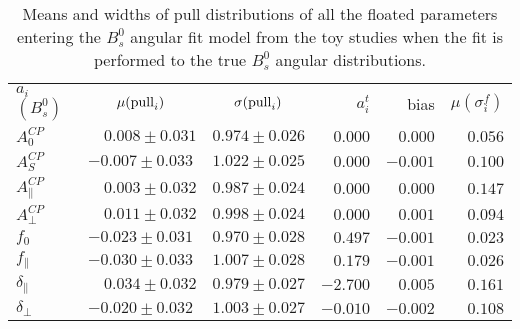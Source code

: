 \begin{table}[htbp]
\begin{center}
\caption[Means and widths of pull distributions of all the floated parameters entering the angular fit model from the toy studies when the fit is performed to the true $B^0_s$ angular distributions]{\label{tab:AngularPullResults_sigBs} Means and widths of pull distributions of all the floated parameters entering the $B^0_s$ angular fit model from the toy studies when the fit is performed to the true $B^0_s$ angular distributions. }%
\vspace{5pt}
\begin{tabular}{l|c|c||r|r|r}
 \multirow{2}{*}{$a_i$ $(B^0_s)$} & \multirow{2}{*}{$\mu({\rm pull}_i)$} & \multirow{2}{*}{$\sigma({\rm pull}_i)$} & \multirow{2}{*}{ $a_i^t $ } & \multirow{2}{*}{bias} & \multirow{2}{*}{$\mu(\sigma_i^f) $} \\
					       &	 					  &		&   &   &	\\	
\hline

$A^{C\!P}_0$ 	&$	\phantom{-}0.008	 \pm	0.031	$&$	0.974	 \pm	0.026	$&$	0.000	$&$	0.000	$&$	0.056	 $\\
$A^{C\!P}_S$ 	&$	-0.007	 \pm	0.033	$&$	1.022	 \pm	0.025	$&$	0.000	$&$	-0.001	$&$	0.100	 $\\
$A^{C\!P}_{\|}$ 	&$	\phantom{-}0.003	 \pm	0.032	$&$	0.987	 \pm	0.024	$&$	0.000	$&$	0.000	$&$	0.147	 $\\
$A^{C\!P}_{\perp}$ 	&$	\phantom{-}0.011	 \pm	0.032	$&$	0.998	 \pm	0.024	$&$	0.000	$&$	0.001	$&$	0.094	 $\\
															
\hline															
															
$f_0$	&$	-0.023	 \pm	0.031	$&$	0.970	 \pm	0.028	$&$	0.497	$&$	-0.001	$&$	0.023	 $\\
$f_{\|}$	&$	-0.030	 \pm	0.033	$&$	1.007	 \pm	0.028	$&$	0.179	$&$	-0.001	$&$	0.026	 $\\
$\delta_{\|}$	&$	\phantom{-}0.034	 \pm	0.032	$&$	0.979	 \pm	0.027	$&$	-2.700	$&$	0.005	$&$	0.161	 $\\
$\delta_{\perp}$	&$	-0.020	 \pm	0.032	$&$	1.003	 \pm	0.027	$&$	-0.010	$&$	-0.002	$&$	0.108	 $\\
															
\hline															
															

\end{tabular}
\end{center}
\end{table}
